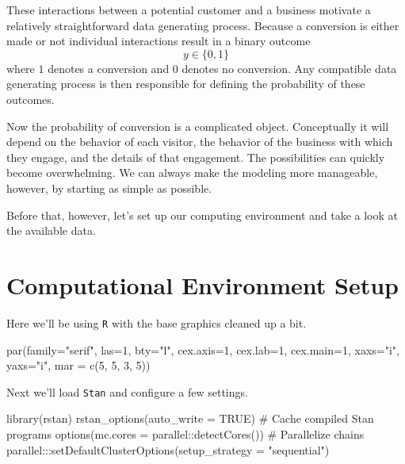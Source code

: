 \documentclass[
  letterpaper,
  DIV=11,
  numbers=noendperiod]{scrartcl}
\newenvironment{Shaded}{\begin{snugshade}}{\end{snugshade}}
\newcommand{\AttributeTok}[1]{\textcolor[rgb]{0.40,0.45,0.13}{#1}}
\newcommand{\CommentTok}[1]{\textcolor[rgb]{0.37,0.37,0.37}{#1}}
\newcommand{\ConstantTok}[1]{\textcolor[rgb]{0.56,0.35,0.01}{#1}}
\newcommand{\DecValTok}[1]{\textcolor[rgb]{0.68,0.00,0.00}{#1}}
\newcommand{\FunctionTok}[1]{\textcolor[rgb]{0.28,0.35,0.67}{#1}}
\newcommand{\NormalTok}[1]{\textcolor[rgb]{0.00,0.23,0.31}{#1}}
\newcommand{\SpecialCharTok}[1]{\textcolor[rgb]{0.37,0.37,0.37}{#1}}
\newcommand{\StringTok}[1]{\textcolor[rgb]{0.13,0.47,0.30}{#1}}
\begin{document}
These interactions between a potential customer and a business motivate
a relatively straightforward data generating process. Because a
conversion is either made or not individual interactions result in a
binary outcome \[
y \in \{0, 1\}
\] where \(1\) denotes a conversion and \(0\) denotes no conversion. Any
compatible data generating process is then responsible for defining the
probability of these outcomes.

Now the probability of conversion is a complicated object. Conceptually
it will depend on the behavior of each visitor, the behavior of the
business with which they engage, and the details of that engagement. The
possibilities can quickly become overwhelming. We can always make the
modeling more manageable, however, by starting as simple as possible.

Before that, however, let's set up our computing environment and take a
look at the available data.

\section{Computational Environment
Setup}\label{computational-environment-setup}

Here we'll be using \texttt{R} with the base graphics cleaned up a bit.

\begin{Shaded}
\begin{Highlighting}[]
\FunctionTok{par}\NormalTok{(}\AttributeTok{family=}\StringTok{"serif"}\NormalTok{, }\AttributeTok{las=}\DecValTok{1}\NormalTok{, }\AttributeTok{bty=}\StringTok{"l"}\NormalTok{,}
    \AttributeTok{cex.axis=}\DecValTok{1}\NormalTok{, }\AttributeTok{cex.lab=}\DecValTok{1}\NormalTok{, }\AttributeTok{cex.main=}\DecValTok{1}\NormalTok{,}
    \AttributeTok{xaxs=}\StringTok{"i"}\NormalTok{, }\AttributeTok{yaxs=}\StringTok{"i"}\NormalTok{, }\AttributeTok{mar =} \FunctionTok{c}\NormalTok{(}\DecValTok{5}\NormalTok{, }\DecValTok{5}\NormalTok{, }\DecValTok{3}\NormalTok{, }\DecValTok{5}\NormalTok{))}
\end{Highlighting}
\end{Shaded}

Next we'll load \texttt{Stan} and configure a few settings.

\begin{Shaded}
\begin{Highlighting}[]
\FunctionTok{library}\NormalTok{(rstan)}
\FunctionTok{rstan\_options}\NormalTok{(}\AttributeTok{auto\_write =} \ConstantTok{TRUE}\NormalTok{)            }\CommentTok{\# Cache compiled Stan programs}
\FunctionTok{options}\NormalTok{(}\AttributeTok{mc.cores =}\NormalTok{ parallel}\SpecialCharTok{::}\FunctionTok{detectCores}\NormalTok{()) }\CommentTok{\# Parallelize chains}
\NormalTok{parallel}\SpecialCharTok{:::}\FunctionTok{setDefaultClusterOptions}\NormalTok{(}\AttributeTok{setup\_strategy =} \StringTok{"sequential"}\NormalTok{)}
\end{Highlighting}
\end{Shaded}
\end{document}
